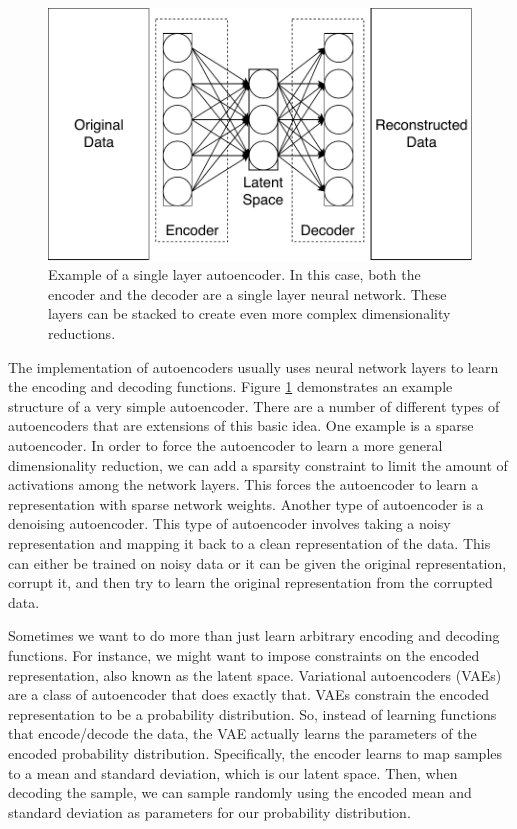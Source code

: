 \begin{figure}[t!]
\begin{center}
\includegraphics{figs/Autoencoder.pdf}
\caption{Example of a single layer autoencoder.
In this case, both the encoder and the decoder are a single layer neural network.
These layers can be stacked to create even more complex dimensionality reductions.}
\end{center}
\label{fig:ae}
\end{figure}

The implementation of autoencoders usually uses neural network layers to learn the encoding and decoding functions.
Figure \ref{fig:ae} demonstrates an example structure of a very simple autoencoder.
There are a number of different types of autoencoders that are extensions of this basic idea.
One example is a sparse autoencoder.
In order to force the autoencoder to learn a more general dimensionality reduction, we can add a sparsity constraint to limit the amount of activations among the network layers.
This forces the autoencoder to learn a representation with sparse network weights.
Another type of autoencoder is a denoising autoencoder.
This type of autoencoder involves taking a noisy representation and mapping it back to a clean representation of the data.
This can either be trained on noisy data or it can be given the original representation, corrupt it, and then try to learn the original representation from the corrupted data.

Sometimes we want to do more than just learn arbitrary encoding and decoding functions.
For instance, we might want to impose constraints on the encoded representation, also known as the latent space.
Variational autoencoders (VAEs) are a class of autoencoder that does exactly that.
VAEs constrain the encoded representation to be a probability distribution.
So, instead of learning functions that encode/decode the data, the VAE actually learns the parameters of the encoded probability distribution.
Specifically, the encoder learns to map samples to a mean and standard deviation, which is our latent space.
Then, when decoding the sample, we can sample randomly using the encoded mean and standard deviation as parameters for our probability distribution.

